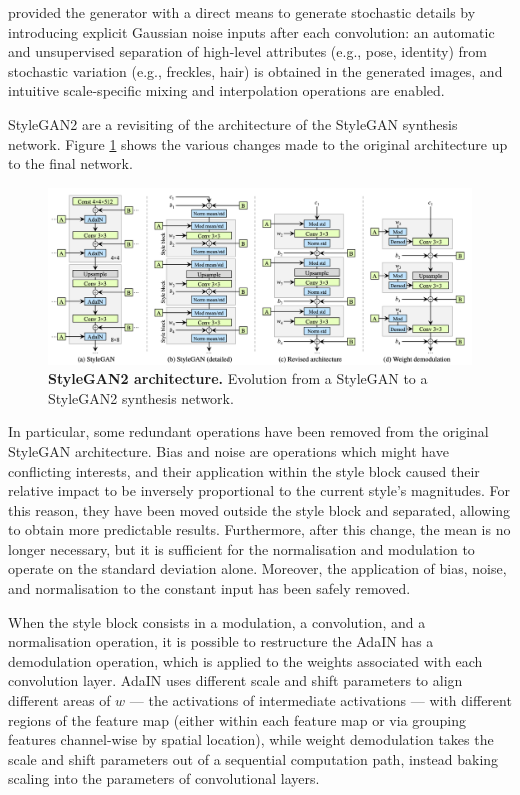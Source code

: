 \documentclass{article}
\begin{document}
	\citet{karras2019style} provided the generator with a direct means to generate stochastic 
	details by 
	introducing explicit Gaussian noise inputs after each convolution: an automatic and 
	unsupervised 
	separation of high-level attributes (e.g., pose, identity) from stochastic variation (e.g., 
	freckles, hair) 
	is obtained in the generated images, and intuitive scale-specific mixing and interpolation 
	operations 
	are enabled.
	
	StyleGAN2 \cite{karras2020analyzing} are a revisiting of the architecture of the StyleGAN synthesis 
	network. Figure \ref{fig:styleGAN2} shows the various changes made to the original architecture up 
	to the final network.
	\begin{figure}[htb]				
		\centering
		\includegraphics[width=.9\linewidth]{images/styleGAN2}
		\caption{\textbf{StyleGAN2 architecture.} Evolution from a StyleGAN to a StyleGAN2 synthesis 
			network.}
		\label{fig:styleGAN2}
	\end{figure}
	
	In particular, some redundant operations have been removed from the original StyleGAN architecture.
	Bias and noise are operations which might have conflicting interests, and their application within the 
	style block caused their relative impact to be inversely proportional to the current style’s 
	magnitudes. For this reason, they have been moved outside the style block and separated, allowing 
	to obtain more predictable results.
	Furthermore, after this change, the mean is no longer necessary, but it is sufficient for the 
	normalisation and modulation to operate on the standard deviation alone.
	Moreover, the application of bias, noise, and normalisation to the constant input has been safely 
	removed. 
	
	When the style block consists in a modulation, a convolution, and a normalisation operation, it is 
	possible to restructure the AdaIN has a demodulation operation, which is applied to the weights 
	associated with each convolution layer. 
	AdaIN uses different scale and shift parameters to align different areas of $w$ — the activations 
	of intermediate activations — with different regions of the feature map (either within each feature 
	map or via grouping features channel-wise by spatial location), while weight demodulation takes the 
	scale and shift parameters out of a sequential computation path, instead baking scaling into the 
	parameters of convolutional layers.
\end{document}
